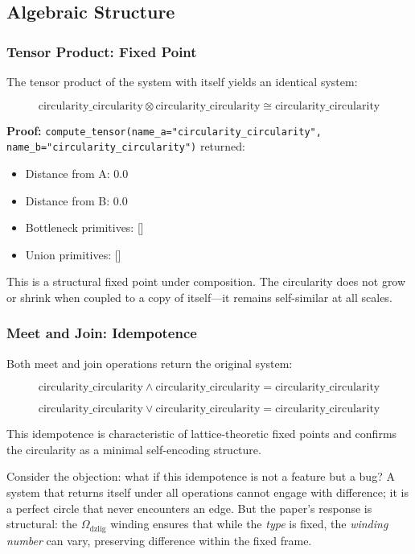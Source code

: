 \documentclass[12pt,a4paper]{article}
\begin{document}
\subsection{Algebraic Structure}

\subsubsection{Tensor Product: Fixed Point}

The tensor product of the system with itself yields an identical system:

\[\text{circularity\_circularity} \otimes \text{circularity\_circularity} \cong \text{circularity\_circularity}\]

\textbf{Proof:} \texttt{compute\_tensor(name\_a="circularity\_circularity", name\_b="circularity\_circularity")} returned:

\begin{itemize}
    \item Distance from A: 0.0
    \item Distance from B: 0.0
    \item Bottleneck primitives: {[}{]}
    \item Union primitives: {[}{]}
\end{itemize}

This is a structural fixed point under composition. The circularity does not grow or shrink when coupled to a copy of itself---it remains self-similar at all scales.

\subsubsection{Meet and Join: Idempotence}

Both meet and join operations return the original system:

\[\text{circularity\_circularity} \wedge \text{circularity\_circularity} = \text{circularity\_circularity}\]




\[\text{circularity\_circularity} \vee \text{circularity\_circularity} = \text{circularity\_circularity}\]

This idempotence is characteristic of lattice-theoretic fixed points and confirms the circularity as a minimal self-encoding structure.

Consider the objection: what if this idempotence is not a feature but a bug? A system that returns itself under all operations cannot engage with difference; it is a perfect circle that never encounters an edge. But the paper's response is structural: the $\Omega_{\text{dzlig}}$ winding ensures that while the \emph{type} is fixed, the \emph{winding number} can vary, preserving difference within the fixed frame.
\end{document}
